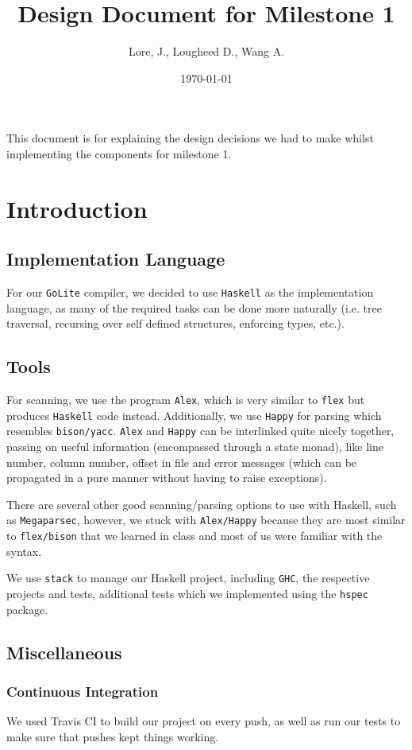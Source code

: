 \documentclass[11pt]{article}
\author{Lore, J., Lougheed D., Wang A.}
\date{\today}
\title{Design Document for Milestone 1}
\begin{document}
\maketitle
\tableofcontents

This document is for explaining the design decisions we had to make
whilst implementing the components for milestone 1.
\section{Introduction}
\label{sec:orgbdd7dd0}
\subsection{Implementation Language}
\label{sec:orgb43b37d}
For our \texttt{GoLite} compiler, we decided to use \texttt{Haskell} as the
implementation language, as many of the required tasks can be done
more naturally (i.e. tree traversal, recursing over self defined
structures, enforcing types, etc.).
\subsection{Tools}
\label{sec:org4ef7ebf}
For scanning, we use the program \texttt{Alex}, which is very similar to \texttt{flex}
but produces \texttt{Haskell} code instead. Additionally, we use \texttt{Happy} for
parsing which resembles \texttt{bison/yacc}. \texttt{Alex} and \texttt{Happy} can be interlinked
quite nicely together, passing on useful information (encompassed
through a state monad), like line number, column number, offset in
file and error messages (which can be propagated in a pure manner
without having to raise exceptions).

There are several other good scanning/parsing options to use with
Haskell, such as \texttt{Megaparsec}, however, we stuck with \texttt{Alex/Happy} because
they are most similar to \texttt{flex/bison} that we learned in class and most
of us were familiar with the syntax.

We use \texttt{stack} to manage our Haskell project, including \texttt{GHC}, the
respective projects and tests, additional tests which we implemented
using the \texttt{hspec} package.
\subsection{Miscellaneous}
\label{sec:orgc42870c}
\subsubsection{Continuous Integration}
\label{sec:org1bc9ef1}
We used Travis CI to build our project on every push, as well as
run our tests to make sure that pushes kept things working.
\end{document}
